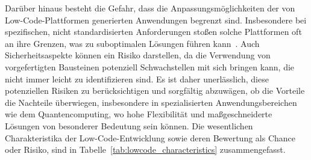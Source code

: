 Darüber hinaus besteht die Gefahr, dass die Anpassungsmöglichkeiten der von Low-Code-Plattformen generierten 
Anwendungen begrenzt sind. Insbesondere bei spezifischen, nicht standardisierten Anforderungen stoßen solche 
Plattformen oft an ihre Grenzen, was zu suboptimalen Lösungen führen kann~\cite{Alamin_2021}. Auch Sicherheitsaspekte 
können ein Risiko darstellen, da die Verwendung von vorgefertigten Bausteinen potenziell Schwachstellen mit sich 
bringen kann, die nicht immer leicht zu identifizieren sind. Es ist daher unerlässlich, diese potenziellen Risiken 
zu berücksichtigen und sorgfältig abzuwägen, ob die Vorteile die Nachteile überwiegen, insbesondere in spezialisierten 
Anwendungsbereichen wie dem Quantencomputing, wo hohe Flexibilität und maßgeschneiderte Lösungen von besonderer 
Bedeutung sein können. Die wesentlichen Charakteristika der Low-Code-Entwicklung sowie deren Bewertung als Chance oder Risiko, sind in 
Tabelle~\ref{tab:lowcode_characteristics} zusammengefasst.

